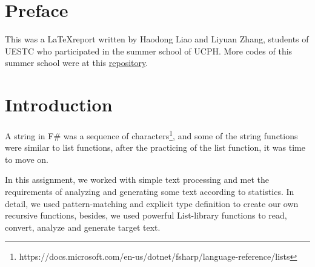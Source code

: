 \documentclass{article}
\begin{document}





\section{Preface}

This was a \LaTeX report written by Haodong Liao and Liyuan Zhang, students of UESTC who participated in the summer school of UCPH. More codes of this summer school were at this \href{https://github.com/Medill-East/ComputerScience/tree/master/Professional%20Core%20Courses/Functional%20Programming/SummerSchool}{repository}.

\section{Introduction}

A string in F\# was a sequence of characters\footnote[1]{https://docs.microsoft.com/en-us/dotnet/fsharp/language-reference/lists}, and some of the string functions were similar to list functions, after the practicing of the list function, it was time to move on.

In this assignment, we worked with simple text processing and met the requirements of analyzing and generating some text according to statistics. In detail, we used pattern-matching and explicit type definition to create our own recursive functions, besides, we used powerful List-library functions to read, convert, analyze and generate target text.


\end{document}

